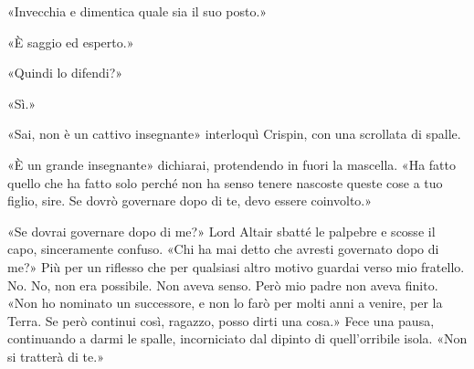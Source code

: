 «Invecchia e dimentica quale sia il suo posto.»

«È saggio ed esperto.»

«Quindi lo difendi?»

«Sì.»

«Sai, non è un cattivo insegnante» interloquì Crispin, con una scrollata
di spalle.

«È un grande insegnante» dichiarai, protendendo in fuori la mascella.
«Ha fatto quello che ha fatto solo perché non ha senso tenere nascoste
queste cose a tuo figlio, sire. Se dovrò governare dopo di te, devo
essere coinvolto.»

«Se dovrai governare dopo di me?» Lord Altair sbatté le palpebre e
scosse il capo, sinceramente confuso. «Chi ha mai detto che avresti
governato dopo di me?» Più per un riflesso che per qualsiasi altro
motivo guardai verso mio fratello. No. No, non era possibile. Non aveva
senso. Però mio padre non aveva finito. «Non ho nominato un successore,
e non lo farò per molti anni a venire, per la Terra. Se però continui
così, ragazzo, posso dirti una cosa.» Fece una pausa, continuando a
darmi le spalle, incorniciato dal dipinto di quell'orribile isola. «Non
si tratterà di te.»